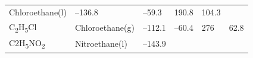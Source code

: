\documentclass[
  9pt,
]{extbook}
\theoremstyle{definition}
\theoremstyle{definition}
\theoremstyle{definition}
\theoremstyle{remark}
\begin{document}
\begin{longtable}[]{@{}llllll@{}}
\begin{minipage}[t]{0.17\columnwidth}
Chloroethane(l)\strut
\end{minipage} & \begin{minipage}[t]{0.15\columnwidth}\raggedright
--136.8\strut
\end{minipage} & \begin{minipage}[t]{0.15\columnwidth}\raggedright
--59.3\strut
\end{minipage} & \begin{minipage}[t]{0.14\columnwidth}\raggedright
190.8\strut
\end{minipage} & \begin{minipage}[t]{0.14\columnwidth}\raggedright
104.3\strut
\end{minipage}\tabularnewline
\begin{minipage}[t]{0.07\columnwidth}\raggedright
C\textsubscript{2}H\textsubscript{5}Cl\strut
\end{minipage} & \begin{minipage}[t]{0.17\columnwidth}\raggedright
Chloroethane(g)\strut
\end{minipage} & \begin{minipage}[t]{0.15\columnwidth}\raggedright
--112.1\strut
\end{minipage} & \begin{minipage}[t]{0.15\columnwidth}\raggedright
--60.4\strut
\end{minipage} & \begin{minipage}[t]{0.14\columnwidth}\raggedright
276\strut
\end{minipage} & \begin{minipage}[t]{0.14\columnwidth}\raggedright
62.8\strut
\end{minipage}\tabularnewline
\begin{minipage}[t]{0.07\columnwidth}\raggedright
C2H\textsubscript{5}NO\textsubscript{2}\strut
\end{minipage} & \begin{minipage}[t]{0.17\columnwidth}\raggedright
Nitroethane(l)\strut
\end{minipage} & \begin{minipage}[t]{0.15\columnwidth}\raggedright
--143.9\strut
\end{minipage} & \begin{minipage}[t]{0.15\columnwidth}\raggedright
\strut
\end{minipage} & \begin{minipage}[t]{0.14\columnwidth}\raggedright
\strut
\end{minipage} & \begin{minipage}[t]{0.14\columnwidth}\raggedright

\end{minipage}
\end{longtable}
\end{document}
